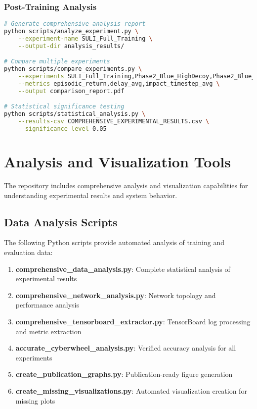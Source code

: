 \documentclass[12pt,a4paper]{article}
\begin{document}
\subsubsection{Post-Training Analysis}
\begin{lstlisting}[language=bash, caption=Post-Training Analysis]
# Generate comprehensive analysis report
python scripts/analyze_experiment.py \
    --experiment-name SULI_Full_Training \
    --output-dir analysis_results/

# Compare multiple experiments
python scripts/compare_experiments.py \
    --experiments SULI_Full_Training,Phase2_Blue_HighDecoy,Phase2_Blue_LowDecoy \
    --metrics episodic_return,delay_avg,impact_timestep_avg \
    --output comparison_report.pdf

# Statistical significance testing
python scripts/statistical_analysis.py \
    --results-csv COMPREHENSIVE_EXPERIMENTAL_RESULTS.csv \
    --significance-level 0.05
\end{lstlisting}

\section{Analysis and Visualization Tools}

The repository includes comprehensive analysis and visualization capabilities for understanding experimental results and system behavior.

\subsection{Data Analysis Scripts}

The following Python scripts provide automated analysis of training and evaluation data:

\begin{enumerate}
    \item \textbf{comprehensive\_data\_analysis.py}: Complete statistical analysis of experimental results
    \item \textbf{comprehensive\_network\_analysis.py}: Network topology and performance analysis
    \item \textbf{comprehensive\_tensorboard\_extractor.py}: TensorBoard log processing and metric extraction
    \item \textbf{accurate\_cyberwheel\_analysis.py}: Verified accuracy analysis for all experiments
    \item \textbf{create\_publication\_graphs.py}: Publication-ready figure generation
    \item \textbf{create\_missing\_visualizations.py}: Automated visualization creation for missing plots
\end{enumerate}
\end{document}
